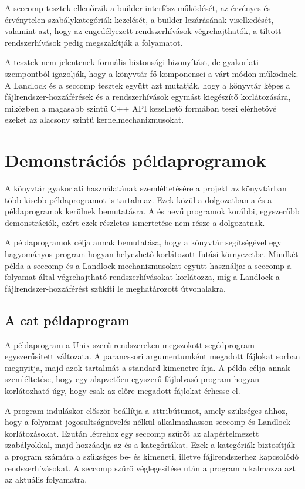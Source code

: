 A seccomp tesztek ellenőrzik a builder interfész működését, az érvényes és
érvénytelen szabálykategóriák kezelését, a builder lezárásának viselkedését,
valamint azt, hogy az engedélyezett rendszerhívások végrehajthatók, a tiltott
rendszerhívások pedig megszakítják a folyamatot.

A tesztek nem jelentenek formális biztonsági bizonyítást, de gyakorlati
szempontból igazolják, hogy a könyvtár fő komponensei a várt módon működnek. A
Landlock és a seccomp tesztek együtt azt mutatják, hogy a könyvtár képes a
fájlrendszer-hozzáférések és a rendszerhívások egymást kiegészítő
korlátozására, miközben a magasabb szintű C++ API kezelhető formában teszi
elérhetővé ezeket az alacsony szintű kernelmechanizmusokat.

\section{Demonstrációs példaprogramok}

A könyvtár gyakorlati használatának szemléltetésére a projekt az
 könyvtárban több kisebb példaprogramot is tartalmaz. Ezek közül
a dolgozatban a  és a  példaprogramok
kerülnek bemutatásra. A  és
 nevű programok korábbi, egyszerűbb
demonstrációk, ezért ezek részletes ismertetése nem része a dolgozatnak.

A példaprogramok célja annak bemutatása, hogy a könyvtár segítségével egy
hagyományos program hogyan helyezhető korlátozott futási környezetbe. Mindkét
példa a seccomp és a Landlock mechanizmusokat együtt használja: a seccomp a
folyamat által végrehajtható rendszerhívásokat korlátozza, míg a Landlock a
fájlrendszer-hozzáférést szűkíti le meghatározott útvonalakra.

\subsection{A cat példaprogram}

A  példaprogram a Unix-szerű rendszereken megszokott 
segédprogram egyszerűsített változata. A parancssori argumentumként megadott
fájlokat sorban megnyitja, majd azok tartalmát a standard kimenetre írja. A
példa célja annak szemléltetése, hogy egy alapvetően egyszerű fájlolvasó program
hogyan korlátozható úgy, hogy csak az előre megadott fájlokat érhesse el.

A program induláskor először beállítja a 
attribútumot, amely szükséges ahhoz, hogy a folyamat jogosultságnövelés nélkül
alkalmazhasson seccomp és Landlock korlátozásokat. Ezután létrehoz egy seccomp
szűrőt az alapértelmezett szabályokkal, majd hozzáadja az  és a
 kategóriákat. Ezek a kategóriák biztosítják a
program számára a szükséges be- és kimeneti, illetve fájlrendszerhez kapcsolódó
rendszerhívásokat. A seccomp szűrő véglegesítése után a program alkalmazza azt
az aktuális folyamatra.

